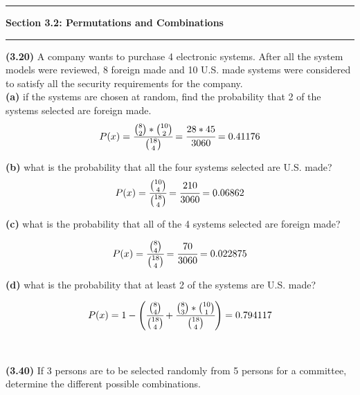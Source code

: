 \documentclass[11pt]{article}
\newcommand\question[2]{\vspace{.25in}\hrule\textbf{#1: #2}\vspace{.5em}\hrule\vspace{.10in}}
\renewcommand\part[1]{\vspace{.10in}\textbf{(#1)}}
\begin{document}
\question{Section 3.2}{Permutations and Combinations}

\part{3.20} A company wants to purchase 4 electronic systems. After all the system models were reviewed, 8 foreign made and 10 U.S. made systems were considered to satisfy all the security requirements for the company. \\
\part{a} if the systems are chosen at random, find the probability that 2 of the systems selected are foreign made. \\

\[
P(x) = \cfrac{ {8\choose 2} * {10\choose 2} }{  {18\choose 4} } = \cfrac{ 28 * 45 }{ 3060 } =  0.41176
\]

\part{b} what is the probability that all the four systems selected are U.S. made? \\

\[
P(x) = \cfrac{  {10\choose 4} }{ {18\choose 4}} = \cfrac{ 210 }{ 3060 } =  0.06862
\]

\part{c} what is the probability that all of the 4 systems selected are foreign made?

\[
P(x) = \cfrac{  {8\choose 4} }{ {18\choose 4}} = \cfrac{ 70 }{ 3060 } =  0.022875
\]

\part{d} what is the probability that at least 2 of the systems are U.S. made?

\[
P(x) = 1 - \left( \cfrac{  {8\choose 4} }{ {18\choose 4}} + \cfrac{ {8\choose 3} * {10\choose 1} }{  {18\choose 4} } \right) =  0.794117
\]  \\ \ \\
\part{3.40} If 3 persons are to be selected randomly from 5 persons for a committee, determine the different possible combinations. \\
\end{document}
